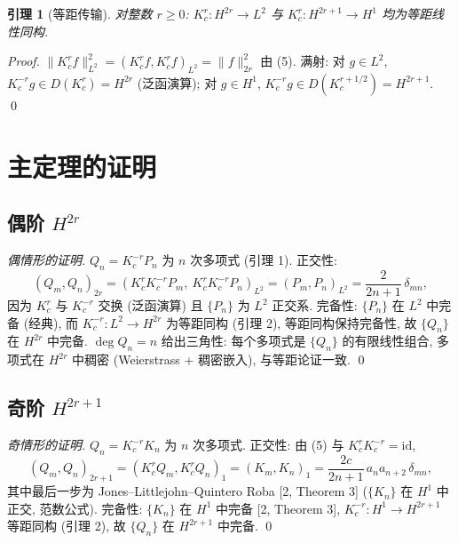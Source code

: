 \documentclass[UTF8]{ctexart}
\newtheorem{lemma}[theorem]{引理}
\begin{document}
\begin{lemma}[等距传输]
	对整数 $r \geq 0$:
	$K_c^r: H^{2r} \to L^2$ 与 $K_c^r: H^{2r+1} \to H^1$ 均为等距线性同构.
\end{lemma}

\begin{proof}
	$\|K_c^r f\|_{L^2}^2 = (K_c^r f, K_c^r f)_{L^2} = \|f\|_{2r}^2$ 由 (5).
	满射: 对 $g \in L^2$, $K_c^{-r}g \in D(K_c^r) = H^{2r}$ (泛函演算);
	对 $g \in H^1$, $K_c^{-r}g \in D(K_c^{r+1/2}) = H^{2r+1}$. \qed
\end{proof}

\section{主定理的证明}

\subsection{偶阶 \texorpdfstring{$H^{2r}$}{H2r}}

\begin{proof}[偶情形的证明]
	$Q_n = K_c^{-r}P_n$ 为 $n$ 次多项式 (引理 1). 正交性:
	\[
		(Q_m, Q_n)_{2r} = (K_c^r K_c^{-r}P_m,\ K_c^r K_c^{-r}P_n)_{L^2}
			= (P_m, P_n)_{L^2} = \frac{2}{2n+1}\,\delta_{mn},
	\]
	因为 $K_c^r$ 与 $K_c^{-r}$ 交换 (泛函演算) 且 $\{P_n\}$ 为 $L^2$ 正交系.
	完备性: $\{P_n\}$ 在 $L^2$ 中完备 (经典), 而 $K_c^{-r}: L^2 \to H^{2r}$
	为等距同构 (引理 2), 等距同构保持完备性, 故 $\{Q_n\}$ 在 $H^{2r}$ 中完备.
	$\deg Q_n = n$ 给出三角性: 每个多项式是 $\{Q_n\}$ 的有限线性组合,
	多项式在 $H^{2r}$ 中稠密 (Weierstrass + 稠密嵌入), 与等距论证一致. \qed
\end{proof}

\subsection{奇阶 \texorpdfstring{$H^{2r+1}$}{H2r+1}}

\begin{proof}[奇情形的证明]
	$Q_n = K_c^{-r}K_n$ 为 $n$ 次多项式. 正交性: 由 (5) 与 $K_c^r K_c^{-r} = \mathrm{id}$,
	\[
		(Q_m, Q_n)_{2r+1} = (K_c^r Q_m, K_c^r Q_n)_1 = (K_m, K_n)_1
			= \frac{2c}{2n+1}\, a_n a_{n+2}\, \delta_{mn},
	\]
	其中最后一步为 Jones--Littlejohn--Quintero Roba [2, Theorem 3]
	($\{K_n\}$ 在 $H^1$ 中正交, 范数公式). 完备性: $\{K_n\}$ 在 $H^1$ 中完备
	[2, Theorem 3], $K_c^{-r}: H^1 \to H^{2r+1}$ 等距同构 (引理 2), 故
	$\{Q_n\}$ 在 $H^{2r+1}$ 中完备. \qed
\end{proof}
\end{document}
